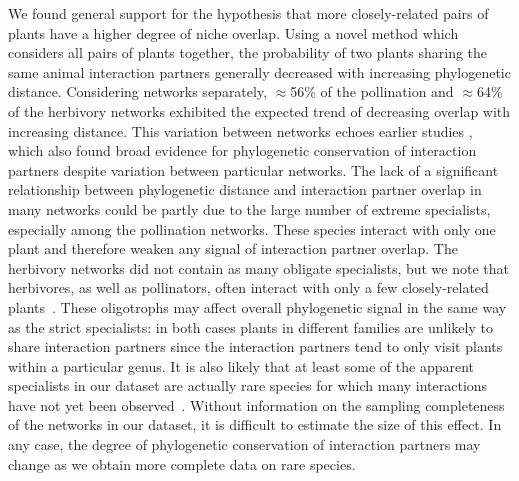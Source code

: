 \documentclass[12pt]{article}
\begin{document}
\begin{spacing}{1.5}
  We found general support for the hypothesis that more
  closely-related pairs of plants have a higher degree
  of niche overlap. Using a novel method which considers
  all pairs of plants together, 
  the probability of two plants sharing the same animal 
  interaction partners generally decreased with increasing 
  phylogenetic distance. Considering networks separately,
  $\approx$56\%  of the pollination and $\approx$64\% of the 
  herbivory networks exhibited the expected trend of decreasing 
  overlap with increasing distance. This variation between networks
  echoes earlier studies \citep[e.g.,][]{Fontaine2015,Hutchinson2017},
  which also found broad evidence for phylogenetic conservation 
  of interaction partners despite variation between particular 
  networks. The lack of a significant relationship between
  phylogenetic distance and interaction partner overlap in many
  networks could be partly due to the large number of extreme
  specialists, especially among the pollination networks.
  These species interact with only one plant and
  therefore weaken any signal of interaction partner overlap.
  The herbivory networks did not contain as many obligate 
  specialists, but we note that herbivores, as well as pollinators, often interact with only a few closely-related plants~\citep{Novotny2005,Brandle2006,Astegiano2017}.
  These oligotrophs may affect overall phylogenetic signal in the same
  way as the strict specialists: in both cases plants in different
  families are unlikely to share interaction partners since the interaction partners tend to only visit plants within a particular genus. It is also likely that at least some of the apparent specialists in our dataset are actually rare species for which many interactions have not yet been observed~\citep{Bluthgen2006,Poisot2015}. Without information on the sampling completeness of the networks in our dataset, it is difficult to estimate the size of this effect. In any case, the degree of phylogenetic conservation of interaction partners may change as we obtain more complete data on rare species.



\end{spacing}
\end{document}
